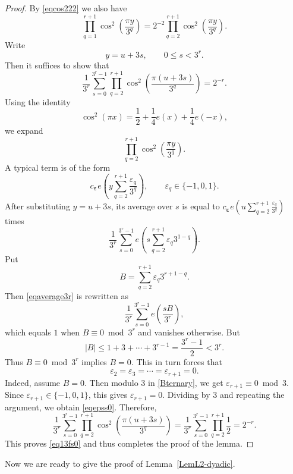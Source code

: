 \documentclass[10pt,a4paper]{amsart}
\numberwithin{equation}{section} %
\begin{document}
\begin{proof}
By \eqref{eqcos222} we also have 
\[\prod_{q=1}^{r+1}
\cos^2\left(\frac{\pi y}{3^q}\right)=2^{-2}\prod_{q=2}^{r+1}
\cos^2\left(\frac{\pi y}{3^q}\right).\]
Write
	\[
	y=u+3s,
	\qquad 0\leq s<3^r.
	\]
Then it suffices to show that  
\begin{equation}\label{eq13fs0}
\frac{1}{3^r}
\sum_{s=0}^{3^r-1}
\prod_{q=2}^{r+1}
\cos^2\left(\frac{\pi (u+3s)}{3^q}\right)
=2^{-r}.
\end{equation}
Using the identity 
\begin{equation*}
		\cos^2(\pi x)=\frac12+\frac14 e(x)+\frac14 e(-x),
\end{equation*}
	we expand
	\[
	\prod_{q=2}^{r+1}
	\cos^2\left(\frac{\pi y}{3^q}\right).\]
	A typical term is of the form
	\[
	c_{\boldsymbol\varepsilon}
	e\left(y\sum_{q=2}^{r+1}\frac{\varepsilon_q}{3^q}\right),
	\qquad
	\varepsilon_q\in\{-1,0,1\}.
	\]
After substituting \(y=u+3s\), its average over \(s\) is equal to $	c_{\boldsymbol\varepsilon}e\left(u\sum_{q=2}^{r+1}\frac{\varepsilon_q}{3^q}\right)$ times 
\begin{equation}\label{eqaverage3r}
\frac{1}{3^r}\sum_{s=0}^{3^r-1}
e\left(s\sum_{q=2}^{r+1}\varepsilon_q 3^{1-q}\right).
\end{equation}
Put
\begin{equation}\label{Bternary}
B=\sum_{q=2}^{r+1}\varepsilon_q 3^{r+1-q}.
\end{equation}
Then \eqref{eqaverage3r} is rewritten as 
	\[
	\frac{1}{3^r}\sum_{s=0}^{3^r-1} e\left(\frac{sB}{3^r}\right),
	\]
	which equals $1$ when $B\equiv 0\bmod {3^r}$ and vanishes  otherwise.  But
	\[
	|B|\leq 1+3+\cdots+3^{r-1}=\frac{3^r-1}{2}<3^r.
	\]
	Thus $B\equiv 0\bmod {3^r}$ implies $B=0$. This in turn forces that
\begin{equation}\label{eqepss0}
\varepsilon_2=\varepsilon_3=\cdots=\varepsilon_{r+1}=0.
\end{equation}
Indeed, assume $B=0$. Then modulo \(3\) in \eqref{Bternary}, we get
\(\varepsilon_{r+1}\equiv 0\bmod 3\). Since
\(\varepsilon_{r+1}\in\{-1,0,1\}\), this gives
\(\varepsilon_{r+1}=0\). Dividing by \(3\) and repeating the argument,
we obtain \eqref{eqepss0}. 
Therefore, 
\[\frac{1}{3^r}
\sum_{s=0}^{3^r-1}
\prod_{q=2}^{r+1}
\cos^2\left(\frac{\pi (u+3s)}{3^q}\right)
=\frac{1}{3^r}
\sum_{s=0}^{3^r-1}
\prod_{q=2}^{r+1}\frac{1}{2}=2^{-r}.\]
This proves \eqref{eq13fs0} and thus completes the proof of the lemma. 
\end{proof}

Now we are ready to give the proof of Lemma~\ref{LemL2-dyadic}.
\end{document}
